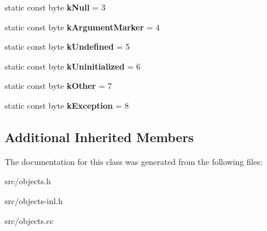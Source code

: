 \begin{DoxyCompactItemize}
\item 
\hypertarget{classv8_1_1internal_1_1_oddball_a7e9e260f9a1ee980b4ac12e2d534ff27}{}static const byte {\bfseries k\+Null} = 3\label{classv8_1_1internal_1_1_oddball_a7e9e260f9a1ee980b4ac12e2d534ff27}

\item 
\hypertarget{classv8_1_1internal_1_1_oddball_a3fa2607976e877ccca4e4b2e23a060a6}{}static const byte {\bfseries k\+Argument\+Marker} = 4\label{classv8_1_1internal_1_1_oddball_a3fa2607976e877ccca4e4b2e23a060a6}

\item 
\hypertarget{classv8_1_1internal_1_1_oddball_a38ddddfd10d8732bcef0714b3bd57008}{}static const byte {\bfseries k\+Undefined} = 5\label{classv8_1_1internal_1_1_oddball_a38ddddfd10d8732bcef0714b3bd57008}

\item 
\hypertarget{classv8_1_1internal_1_1_oddball_ab030131494be698f1e666ce7d50cc873}{}static const byte {\bfseries k\+Uninitialized} = 6\label{classv8_1_1internal_1_1_oddball_ab030131494be698f1e666ce7d50cc873}

\item 
\hypertarget{classv8_1_1internal_1_1_oddball_af181f2f5cc1b00216ed1a2ebacecc40e}{}static const byte {\bfseries k\+Other} = 7\label{classv8_1_1internal_1_1_oddball_af181f2f5cc1b00216ed1a2ebacecc40e}

\item 
\hypertarget{classv8_1_1internal_1_1_oddball_a56b06e715a40821036ac6fec67b7ec60}{}static const byte {\bfseries k\+Exception} = 8\label{classv8_1_1internal_1_1_oddball_a56b06e715a40821036ac6fec67b7ec60}

\end{DoxyCompactItemize}
\subsection*{Additional Inherited Members}


The documentation for this class was generated from the following files\+:\begin{DoxyCompactItemize}
\item 
src/objects.\+h\item 
src/objects-\/inl.\+h\item 
src/objects.\+cc\end{DoxyCompactItemize}
